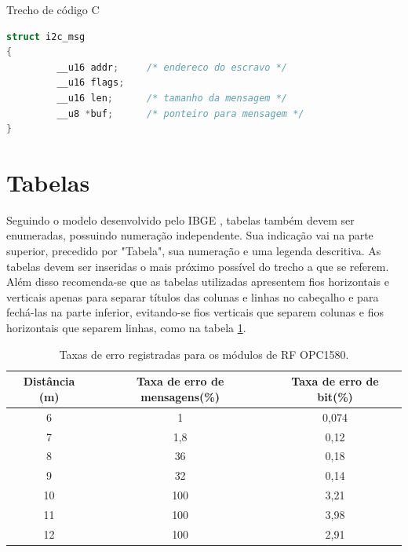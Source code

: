 \documentclass[repeatfields,xlists,xpacks,oneside,yearsonly]{ufrgscca}
\begin{document}
\begin{codelist}[htbp]
\caption{Trecho de código C}
\label{code01}
\begin{lstlisting}[language=C]
struct i2c_msg
{
         __u16 addr;     /* endereco do escravo */
         __u16 flags;
         __u16 len;      /* tamanho da mensagem */
         __u8 *buf;      /* ponteiro para mensagem */
}
\end{lstlisting}
{}
\end{codelist}



\section{Tabelas}

Seguindo o modelo desenvolvido pelo IBGE \cite{IBGE:tabular-1993}, tabelas também devem ser enumeradas, possuindo numeração independente. Sua
indicação vai na parte superior, precedido por "Tabela", sua numeração e uma
legenda descritiva. As tabelas devem ser inseridas o
mais próximo possível do trecho a que se referem.
 Além disso recomenda-se que as tabelas utilizadas apresentem fios
horizontais e verticais apenas para separar títulos das colunas e linhas no
cabeçalho e para fechá-las na parte inferior, evitando-se fios verticais que
separem colunas e fios horizontais que separem linhas, como na tabela \ref{standarttable}.

\begin{table}[htb]
 \begin{center}
  \caption{Taxas de erro registradas para os módulos de RF OPC1580.}\label{standarttable}
  \begin{tabular}{c|cc}
  \hline
  Distância (m) & Taxa de erro de mensagens(\%) & Taxa de erro de bit(\%)\\
  \hline
  6	& 1 	& 0,074\\
  7	& 1,8	& 0,12\\
  8 	& 36  	& 0,18\\
  9	& 32  	& 0,14\\
  10	& 100	& 3,21\\
  11	& 100	& 3,98\\
  12	& 100	& 2,91\\
  \hline
  \end{tabular}
 \end{center}
{}
\end{table}
\end{document}
